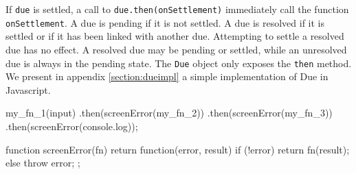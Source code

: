 If \texttt{due} is settled, a call to \texttt{due.then(onSettlement)} immediately call the function \texttt{onSettlement}.
A due is pending if it is not settled.
A due is resolved if it is settled or if it has been linked with another due.
Attempting to settle a resolved due has no effect.
A resolved due may be pending or settled, while an unresolved due is always in the pending state.
The \texttt{Due} object only exposes the \texttt{then} method.
We present in appendix \ref{section:dueimpl} a simple implementation of Due in Javascript.

\begin{code}[js, %
             caption={Dues are chained like Promises}, %
             label={lst:dues-sequence}] %
my_fn_1(input)
.then(screenError(my_fn_2))
.then(screenError(my_fn_3))
.then(screenError(console.log));

function screenError(fn) {
  return function(error, result) {
    if (!error) {
      return fn(result);
    } else {
      throw error;
    }
  };
}
\end{code}